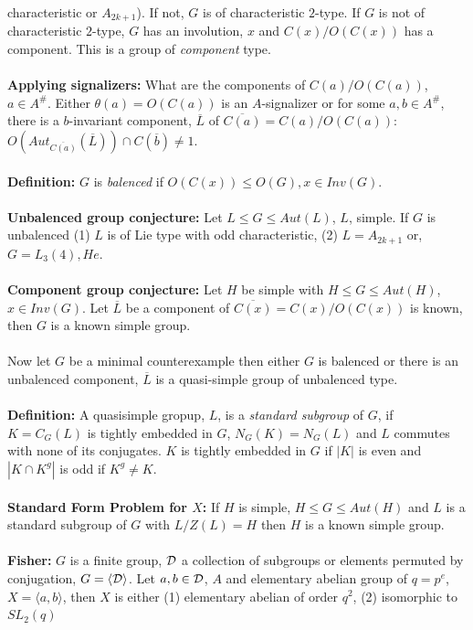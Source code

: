 characteristic or $A_{2k+1}$).  If not, $G$ is of characteristic $2$-type.  If $G$ is not of characteristic $2$-type, $G$
has an involution, $x$ and $C(x)/O(C(x))$ has a component.  This is a group of \emph{component} type.
\\
\\
{\bf Applying signalizers:}  What are the components of $C(a)/O(C(a))$, $a \in A^{\#}$.  Either $\theta(a)=O(C(a))$ is
an $A$-signalizer or for some $a,b \in A^{\#}$, there is a $b$-invariant component, ${\overline L}$ of
${\overline {C(a)}}= C(a)/O(C(a))$: $O(Aut_{\overline {C(a)}}({\overline L})) \cap C({\overline b}) \ne 1$.
\\
\\
{\bf Definition:} $G$ is \emph{balenced} if $O(C(x)) \leq O(G), x \in Inv(G)$.\\
\\
{\bf Unbalenced group conjecture:} Let $L \leq G \leq Aut(L)$, $L$, simple.   If $G$ is unbalenced
(1) $L$ is of Lie type with odd characteristic, (2) $L=A_{2k+1}$ or, $G=L_3(4), He$.
\\
\\
{\bf Component group conjecture:} Let $H$ be simple with $H \leq G \leq Aut(H)$, $x \in Inv(G)$.  Let ${\overline L}$
be a component of ${\overline {C(x)}} = C(x)/O(C(x))$ is known, then $G$ is a known simple group.\\
\\
Now let $G$ be a minimal counterexample then either $G$ is balenced or there is an unbalenced component, ${\overline L}$
is a quasi-simple group of unbalenced type.
\\
\\
{\bf Definition:} A quasisimple gropup, $L$, is a \emph{standard subgroup} of $G$, if $K=C_G(L)$ is tightly embedded in $G$,
$N_G(K)=N_G(L)$ and $L$ commutes with none of its conjugates.  $K$ is tightly embedded in $G$ if $|K|$ is even and $|K \cap K^g|$
is odd if $K^g \ne K$.
\\
\\
{\bf Standard Form Problem for $X$:}  If $H$ is simple, $H \leq G \leq Aut(H)$ and $L$ is a standard subgroup of $G$
with $L/Z(L) = H$ then $H$ is a known simple group.
\\
\\
{\bf Fisher:} $G$ is a finite group, ${\cal D}$ a collection of subgroups or elements permuted by conjugation, 
$G = \langle {\cal D} \rangle$.  Let $a,b \in {\cal D}$, $A$ and elementary abelian group of $q=p^e$,
$X= \langle a, b \rangle$, then $X$ is either (1) elementary abelian of order $q^2$, (2) isomorphic to $SL_2(q)$
